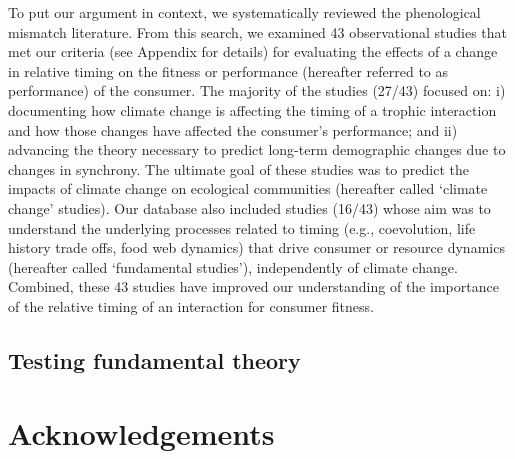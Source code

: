 \documentclass[11pt,letterpaper]{article}
\begin{document}
To put our argument in context, we systematically reviewed the phenological mismatch literature. From this search, we examined 43 observational studies that met our criteria (see Appendix for details) for evaluating the effects of a change in relative timing on the fitness or performance (hereafter referred to as performance) of the consumer. The majority of the studies (27/43) focused on: i) documenting how climate change is affecting the timing of a trophic interaction and how those changes have affected the consumer’s performance; and ii) advancing the theory necessary to predict long-term demographic changes due to changes in synchrony. The ultimate goal of these studies was to predict the impacts of climate change on ecological communities (hereafter called ‘climate change’ studies). Our database also included studies (16/43) whose aim was to understand the underlying processes related to timing (e.g., coevolution, life history trade offs, food web dynamics) that drive consumer or resource dynamics (hereafter called ‘fundamental studies’), independently of climate change. Combined, these 43 studies have improved our understanding of the importance of the relative timing of an interaction for consumer fitness.\par

\subsection{Testing fundamental theory}


\section{Acknowledgements}




\end{document}
